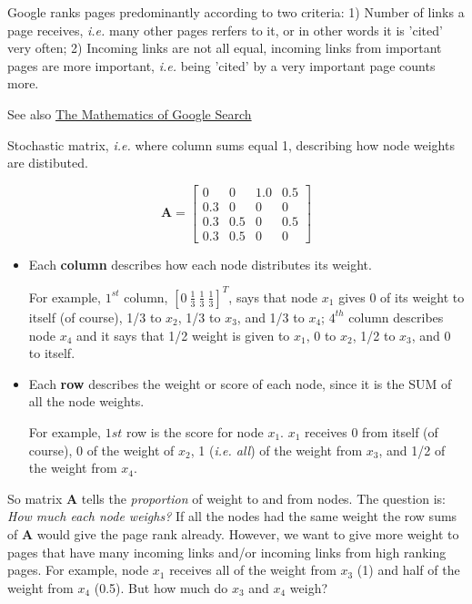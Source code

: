 Google ranks pages predominantly according to two criteria: 1) Number of links a page
receives, \emph{i.e.} many other pages rerfers to it, or in other words it is 'cited' very often;
2) Incoming links are not all equal, incoming links from important pages are more
important, \emph{i.e.} being 'cited' by a very important page counts more.

See also \href{http://www.math.cornell.edu/~mec/Winter2009/RalucaRemus/Lecture3/lecture3.html}{The Mathematics of Google Search}

Stochastic matrix, \textit{i.e.} where column sums equal 1, describing how node weights
are distibuted.

\begin{equation}
\mathbf{A} = \left[\begin{matrix}0 & 0 & 1.0 & 0.5\\0.3 & 0 & 0 & 0\\0.3 & 0.5 & 0 & 0.5\\0.3 & 0.5 & 0 & 0\end{matrix}\right]
\end{equation}

\begin{itemize}
\item Each \textbf{column} describes how each node distributes its weight.

For example, $1^{st}$ column, $[0\ \frac{1}{3}\ \frac{1}{3}\ \frac{1}{3}]^T$, says that node $x_1$ gives 0 of its
weight to itself (of course), 1/3 to $x_2$, 1/3 to $x_3$, and 1/3 to $x_4$;
$4^{th}$ column describes node $x_4$ and it says that 1/2 weight is given to $x_1$,
0 to $x_2$, 1/2 to $x_3$, and 0 to itself.

\item Each \textbf{row} describes the weight or score of each node, since it is the SUM
of all the node weights.

For example, $1st$ row is the score for node $x_1$. $x_1$
receives 0 from itself (of course), 0 of the weight of $x_2$, 1 (\textit{i.e. all})
of the weight from $x_3$, and 1/2 of the weight from $x_4$.
\end{itemize}

So matrix \textbf{A} tells the \textit{proportion} of weight to and from nodes. The question
is: \emph{How much each node weighs?} If all the nodes had the same weight the row sums
of \textbf{A} would give the page rank already. However, we want to give more weight
to pages that have many incoming links and/or incoming links from high ranking pages.
For example, node $x_1$ receives all of the weight from $x_3$ (1) and half of the weight
from $x_4$ (0.5). But how much do $x_3$ and $x_4$ weigh?

